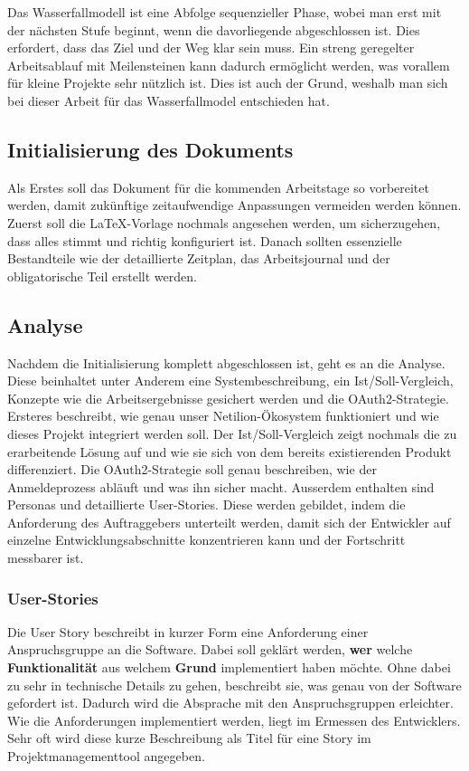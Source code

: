 Das Wasserfallmodell ist eine Abfolge sequenzieller Phase, wobei man erst mit der nächsten Stufe beginnt, wenn die davorliegende abgeschlossen ist. Dies erfordert, dass das Ziel und der Weg klar sein muss. Ein streng geregelter Arbeitsablauf mit Meilensteinen kann dadurch ermöglicht werden, was vorallem für kleine Projekte sehr nützlich ist. Dies ist auch der Grund, weshalb man sich bei dieser Arbeit für das Wasserfallmodel entschieden hat.

\subsection{Initialisierung des Dokuments}

Als Erstes soll das Dokument für die kommenden Arbeitstage so vorbereitet werden, damit zukünftige zeitaufwendige Anpassungen vermeiden werden können. Zuerst soll die LaTeX-Vorlage nochmals angesehen werden, um sicherzugehen, dass alles stimmt und richtig konfiguriert ist. Danach sollten essenzielle Bestandteile wie der detaillierte Zeitplan, das Arbeitsjournal und der obligatorische Teil erstellt werden.

\subsection{Analyse}

Nachdem die Initialisierung komplett abgeschlossen ist, geht es an die Analyse. Diese beinhaltet unter Anderem eine Systembeschreibung, ein Ist/Soll-Vergleich, Konzepte wie die Arbeitsergebnisse gesichert werden und die OAuth2-Strategie. Ersteres beschreibt, wie genau unser Netilion-Ökosystem funktioniert und wie dieses Projekt integriert werden soll. Der Ist/Soll-Vergleich zeigt nochmals die zu erarbeitende Lösung auf und wie sie sich von dem bereits existierenden Produkt differenziert. Die OAuth2-Strategie soll genau beschreiben, wie der Anmeldeprozess abläuft und was ihn sicher macht.
\newline
Ausserdem enthalten sind Personas und detaillierte User-Stories. Diese werden gebildet, indem die Anforderung des Auftraggebers unterteilt werden, damit sich der Entwickler auf einzelne Entwicklungsabschnitte konzentrieren kann und der Fortschritt messbarer ist.

\subsubsection{User-Stories}

Die User Story beschreibt in kurzer Form eine Anforderung einer Anspruchsgruppe an die Software. Dabei soll geklärt werden, \textbf{wer} welche \textbf{Funktionalität} aus welchem \textbf{Grund} implementiert haben möchte\cite{atlassian_2021_user}. Ohne dabei zu sehr in technische Details zu gehen, beschreibt sie, was genau von der Software gefordert ist. Dadurch wird die Absprache mit den Anspruchsgruppen erleichter. Wie die Anforderungen implementiert werden, liegt im Ermessen des Entwicklers. Sehr oft wird diese kurze Beschreibung als Titel für eine Story im Projektmanagementtool angegeben.

